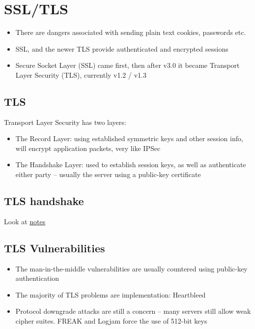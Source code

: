 \documentclass{article}
\begin{document}
\section{SSL/TLS}
\begin{itemize}
	\item There are dangers associated with sending plain text cookies, passwords etc. 
	\item SSL, and the newer TLS provide authenticated and encrypted sessions 
	\item Secure Socket Layer (SSL) came first, then after v3.0 it became Transport Layer Security (TLS), currently v1.2 / v1.3
\end{itemize}

\subsection{TLS}
Transport Layer Security has two layers:
\begin{itemize}
	\item The Record Layer: using established symmetric keys and other session info, will encrypt application packets, very like IPSec 
	\item The Handshake Layer: used to establish session keys, as well as authenticate either party – usually the server using a public-key certificate
\end{itemize}

\subsection{TLS handshake}
\begin{flushleft}
Look at \href{https://moodle.nottingham.ac.uk/pluginfile.php/5124101/mod_resource/content/0/L15%20-%20Internet%20Security%202pp.pdf}{notes}
\end{flushleft}

\subsection{TLS Vulnerabilities}
\begin{itemize}
	\item The man-in-the-middle vulnerabilities are usually countered using public-key authentication 
	\item The majority of TLS problems are implementation: Heartbleed 
	\item Protocol downgrade attacks are still a concern – many servers still allow weak cipher suites. FREAK and Logjam force the use of 512-bit keys
\end{itemize}
\end{document}
